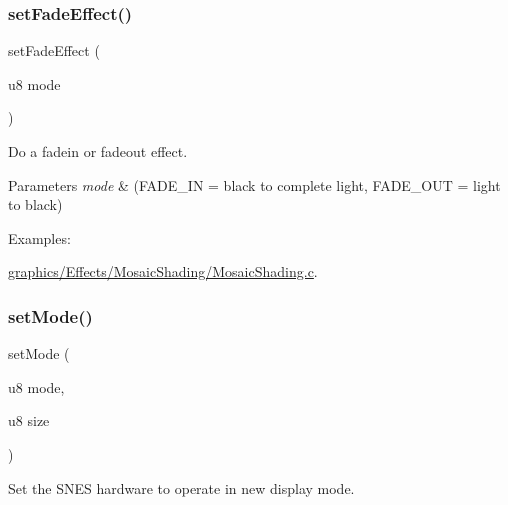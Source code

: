 \subsubsection{\texorpdfstring{set\+Fade\+Effect()}{setFadeEffect()}}
{\footnotesize\ttfamily set\+Fade\+Effect (\begin{DoxyParamCaption}\item[{u8}]{mode }\end{DoxyParamCaption})}



Do a fadein or fadeout effect. 


\begin{DoxyParams}{Parameters}
{\em mode} & (F\+A\+D\+E\+\_\+\+IN = black to complete light, F\+A\+D\+E\+\_\+\+O\+UT = light to black) \\
\hline
\end{DoxyParams}
\begin{Desc}
\item[Examples\+: ]\par
\hyperlink{a00406}{graphics/\+Effects/\+Mosaic\+Shading/\+Mosaic\+Shading.\+c}.\end{Desc}
\mbox{\label{a00353_afd9e46ae627d055dd8c98a4b0ebb73b1}} 
\subsubsection{\texorpdfstring{set\+Mode()}{setMode()}}
{\footnotesize\ttfamily set\+Mode (\begin{DoxyParamCaption}\item[{u8}]{mode,  }\item[{u8}]{size }\end{DoxyParamCaption})}



Set the S\+N\+ES hardware to operate in new display mode. 


